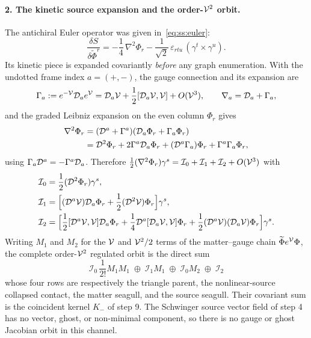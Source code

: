 \paragraph{2. The kinetic source expansion and the order-$\mathcal{V}^{2}$ orbit.}
The antichiral Euler operator was given in~\eqref{eq:ss:euler}:
\begin{equation}\label{eq:ss:bc:euler}
\frac{\delta S}{\delta\widetilde\Phi^{r}}
=-\frac14\,\nabla^{2}\Phi_{r}
-\frac{1}{\sqrt2}\,\varepsilon_{rtu}\,(\gamma^{t}\times\gamma^{u}) .
\end{equation}
Its kinetic piece is expanded covariantly \emph{before} any graph enumeration.
With the undotted frame index $a=(+,-)$, the gauge connection and its
expansion are
\begin{equation}\label{eq:ss:bc:gamma}
\Gamma_{a}:=e^{-\mathcal{V}}\mathcal{D}_{a}e^{\mathcal{V}}
=\mathcal{D}_{a}\mathcal{V}+\frac12[\mathcal{D}_{a}\mathcal{V},\mathcal{V}]+O(\mathcal{V}^{3}),
\qquad
\nabla_{a}=\mathcal{D}_{a}+\Gamma_{a} ,
\end{equation}
and the graded Leibniz expansion on the even column $\Phi_{r}$ gives
\begin{equation}\label{eq:ss:bc:nablasq}
\begin{aligned}
\nabla^{2}\Phi_{r}
&=(\mathcal{D}^{a}+\Gamma^{a})(\mathcal{D}_{a}\Phi_{r}+\Gamma_{a}\Phi_{r})\\
&=\mathcal{D}^{2}\Phi_{r}
+2\Gamma^{a}\mathcal{D}_{a}\Phi_{r}
+(\mathcal{D}^{a}\Gamma_{a})\Phi_{r}
+\Gamma^{a}\Gamma_{a}\Phi_{r} ,
\end{aligned}
\end{equation}
using $\Gamma_{a}\mathcal{D}^{a}=-\Gamma^{a}\mathcal{D}_{a}$. Therefore
$\tfrac12(\nabla^{2}\Phi_{r})\gamma^{s}
=\mathcal I_{0}+\mathcal I_{1}+\mathcal I_{2}+O(\mathcal{V}^{3})$ with
\begin{align}
\mathcal I_{0}&=\frac12(\mathcal{D}^{2}\Phi_{r})\gamma^{s} ,
\label{eq:ss:bc:I0}\\
\mathcal I_{1}&=\Big[(\mathcal{D}^{a}\mathcal{V})\mathcal{D}_{a}\Phi_{r}
+\frac12(\mathcal{D}^{2}\mathcal{V})\Phi_{r}\Big]\gamma^{s} ,
\label{eq:ss:bc:I1}\\
\mathcal I_{2}&=\Big[
\frac12[\mathcal{D}^{a}\mathcal{V},\mathcal{V}]\mathcal{D}_{a}\Phi_{r}
+\frac14\mathcal{D}^{a}[\mathcal{D}_{a}\mathcal{V},\mathcal{V}]\Phi_{r}
+\frac12(\mathcal{D}^{a}\mathcal{V})(\mathcal{D}_{a}\mathcal{V})\Phi_{r}\Big]\gamma^{s} .
\label{eq:ss:bc:I2}
\end{align}
Writing $M_{1}$ and $M_{2}$ for the $\mathcal{V}$ and $\mathcal{V}^{2}/2$ terms of the
matter--gauge chain $\widetilde\Phi e^{\mathcal{V}}\Phi$, the complete order-$\mathcal{V}^{2}$
regulated orbit is the direct sum
\begin{equation}\label{eq:ss:bc:orbit}
\boxed{\;
\mathcal I_{0}\,\frac{1}{2!}M_{1}M_{1}
\;\oplus\;
\mathcal I_{1}M_{1}
\;\oplus\;
\mathcal I_{0}M_{2}
\;\oplus\;
\mathcal I_{2}\;}
\end{equation}
whose four rows are respectively the triangle parent, the nonlinear-source
collapsed contact, the matter seagull, and the source seagull. Their covariant
sum is the coincident kernel $K_{-}$ of step 9. The Schwinger source vector
field of step 4 has no vector, ghost, or non-minimal component, so there is no
gauge or ghost Jacobian orbit in this channel.

